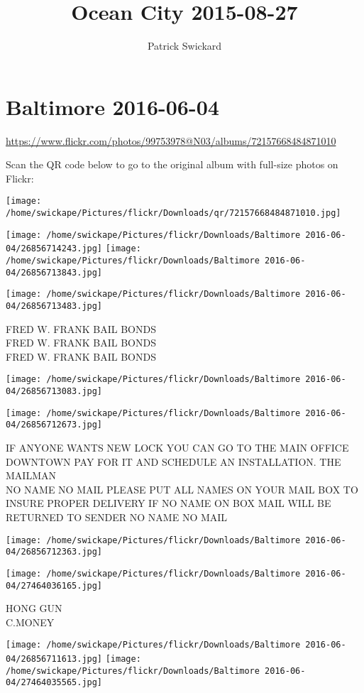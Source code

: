 \documentclass[10pt,letterpaper]{article}
\title{Ocean City 2015-08-27}
\author{Patrick Swickard}
\date{}
\begin{document}
\section*{Baltimore 2016-06-04}

\url{https://www.flickr.com/photos/99753978@N03/albums/72157668484871010}

Scan the QR code below to go to the original album with full-size photos on Flickr:

\texttt{[image: /home/swickape/Pictures/flickr/Downloads/qr/72157668484871010.jpg]}
\pagebreak

\texttt{[image: /home/swickape/Pictures/flickr/Downloads/Baltimore 2016-06-04/26856714243.jpg]}
\texttt{[image: /home/swickape/Pictures/flickr/Downloads/Baltimore 2016-06-04/26856713843.jpg]}

\texttt{[image: /home/swickape/Pictures/flickr/Downloads/Baltimore 2016-06-04/26856713483.jpg]}

FRED W. FRANK BAIL BONDS\\
FRED W. FRANK BAIL BONDS\\
FRED W. FRANK BAIL BONDS
\pagebreak

\texttt{[image: /home/swickape/Pictures/flickr/Downloads/Baltimore 2016-06-04/26856713083.jpg]}

\vspace{0.25in}
\texttt{[image: /home/swickape/Pictures/flickr/Downloads/Baltimore 2016-06-04/26856712673.jpg]}

IF ANYONE WANTS NEW LOCK YOU CAN GO TO THE MAIN OFFICE DOWNTOWN PAY FOR IT AND SCHEDULE AN INSTALLATION. THE MAILMAN\\
NO NAME NO MAIL PLEASE PUT ALL NAMES ON YOUR MAIL BOX TO INSURE PROPER DELIVERY IF NO NAME ON BOX MAIL WILL BE RETURNED TO SENDER NO NAME NO MAIL
\pagebreak

\texttt{[image: /home/swickape/Pictures/flickr/Downloads/Baltimore 2016-06-04/26856712363.jpg]}

\vspace{0.25in}
\texttt{[image: /home/swickape/Pictures/flickr/Downloads/Baltimore 2016-06-04/27464036165.jpg]}

HONG GUN\\
C.MONEY
\pagebreak

\texttt{[image: /home/swickape/Pictures/flickr/Downloads/Baltimore 2016-06-04/26856711613.jpg]}
\texttt{[image: /home/swickape/Pictures/flickr/Downloads/Baltimore 2016-06-04/27464035565.jpg]}
\end{document}
